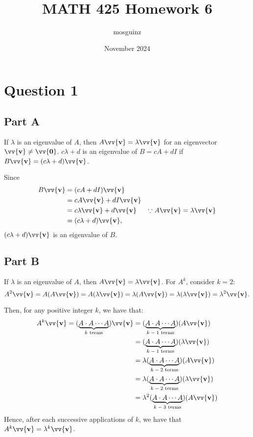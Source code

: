 \documentclass[12pt]{article}
\title{MATH 425 Homework 6}
\author{mosguinz}
\date{November 2024}
\newcommand{\vect}[1]{\vv{\mathbf{#1}}}
\begin{document}
\section*{Question 1}

\subsection*{Part A}

If $\lambda$ is an eigenvalue of $A$, then $A\vect{v}=\lambda\vect{v}$ for an eigenvector $\vect{v}\neq\vect{0}$. $c\lambda+d$ is an eigenvalue of $B=cA+dI$ if $B\vect{v}=(c\lambda+d)\vect{v}$.

Since
\begin{align*}
    B\vect{v} &= (cA+dI)\vect{v} \\
    &= cA\vect{v} + dI\vect{v} \\
    &= c\lambda\vect{v} + d\vect{v} & \because A\vect{v}=\lambda\vect{v}\\
    &= (c\lambda+d)\vect{v},
\end{align*}
$(c\lambda+d)\vect{v}$ is an eigenvalue of $B$.

\subsection*{Part B}

If $\lambda$ is an eigenvalue of $A$, then $A\vect{v}=\lambda\vect{v}$. For $A^k$, consider $k=2$:
$$
A^2\vect{v} = A(A\vect{v}) = A(\lambda\vect{v}) = \lambda(A\vect{v}) = \lambda(\lambda\vect{v}) = \lambda^2\vect{v}.
$$

Then, for any positive integer $k$, we have that:
\begin{align*}
    A^k\vect{v} = (\underbrace{A\cdot A \cdots A}_{\text{$k$ terms}})\vect{v}
    &= (\underbrace{A\cdot A \cdots A}_{\text{$k-1$ terms}})(A\vect{v}) \\
    &= (\underbrace{A\cdot A \cdots A}_{\text{$k-1$ terms}})(\lambda\vect{v}) \\
    &= \lambda(\underbrace{A\cdot A \cdots A}_{\text{$k-2$ terms}})(A\vect{v}) \\
    &= \lambda(\underbrace{A\cdot A \cdots A}_{\text{$k-2$ terms}})(\lambda\vect{v}) \\
    &= \lambda^2(\underbrace{A\cdot A \cdots A}_{\text{$k-3$ terms}})(A\vect{v}) \\
\end{align*}
Hence, after each successive applications of $k$, we have that $A^k\vect{v}=\lambda^k\vect{v}$.
\end{document}
